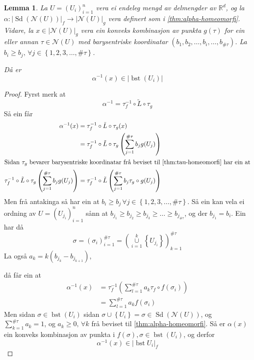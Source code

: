 \documentclass[a4paper, 12pt, norsk]{article}
\theoremstyle{plain}
\newtheorem{lemma}[theorem]{Lemma}
\theoremstyle{definition}
\newcommand{\Rb}{\mathbb{R}}
\newcommand{\Nc}{\mathcal{N}}
\newcommand{\union}{ \mathop{\cup}\limits }
\newcommand{\gr}[1]{ \lvert #1 \rvert } %
\newcommand{\set}[1]{ \left\{ #1 \right\} } %
\newcommand{\tuple}[1]{ \left( #1 \right) } %
\DeclareMathOperator{\Sd}{Sd} %
\DeclareMathOperator{\bst}{bst} %
\begin{document}
\begin{lemma} \label{thm:bst-betingingar}
	La \( U = \tuple{U_i}_{i=1}^n \) vera ei endeleg mengd av delmengder av \( \Rb^d \), og la \( \alpha: \gr{\Sd(\Nc(U))}_f \to \gr{\Nc(U)}_g \) vera definert som i \autoref{thm:alpha-homeomorfi}. Vidare, la \( x \in \gr{\Nc(U)}_g \) vera ein konveks kombinasjon av punkta \( g(\tau) \) for ein eller annan \( \tau \in \Nc(U) \) med barysentriske koordinatar \( \tuple{b_1, b_2,\dots, b_i, \dots, b_{\#\tau}} \). La \( b_i \geq b_j, \, \forall j \in \set{1, 2, 3, \dots, \#\tau} \). 
	
	Då er
	\[ 
		\alpha^{-1}(x) \in \gr{\bst(U_i)}
	\]
\end{lemma}

\begin{proof}
	Fyrst merk at
	\[
		\alpha^{-1} = \tau_f^{-1} \circ \tilde{L} \circ \tau_g
	\]
	Så ein får
	\begin{align*}
		\alpha^{-1}(x) &= \tau_f^{-1} \circ \tilde{L} \circ \tau_g (x) \\
		&= \tau_f^{-1} \circ \tilde{L} \circ \tau_g \tuple{\sum_{j=1}^{\#\tau} b_j g(U_j)} \\
		\intertext{Sidan \( \tau_g \) bevarer barysentriske koordinatar frå beviset til \autoref{thm:tau-homeomorfi} har ein at}
		\tau_f^{-1} \circ \tilde{L} \circ \tau_g \tuple{\sum_{j=1}^{\#\tau} b_j g(U_j)} &= \tau_f^{-1} \circ \tilde{L} \tuple{\sum_{j=1}^{\#\tau} b_j \tau_g \circ g(U_j)}
	\end{align*}
	Men frå antakinga så har ein at \( b_i \geq b_j \, \forall j \in \set{1, 2, 3, \dots, \#\tau} \). Så ein kan vela ei ordning av \( U = \tuple{U_{j_i}}_{i=1}^n \) sånn at \( b_{j_1} \geq b_{j_2} \geq b_{j_3} \geq \dots \geq b_{j_{\#\tau}} \), og der \( b_{j_1}=b_i \). Ein har då 
	\[
		\sigma = \tuple{\sigma_i}_{i=1}^{\#\tau} = \tuple{\union_{i=1}^k \set{U_{j_i}}}_{k=1}^{\#\tau} 
	\]
	La også \( a_k = k\tuple{b_{j_k}-b_{j_{k+1}}} \),

	då får ein at
	\begin{align*}
		\alpha^{-1}(x) &= \tau_f^{-1} \tuple{\sum_{l=1}^{\#\tau}a_k \tau_f \circ f(\sigma_i)} \\
		&= \sum_{l=1}^{\#\tau} a_k f(\sigma_i)
	\end{align*}
	Men sidan \( \sigma \in \bst(U_i) \) sidan \( \sigma \union \set{U_i} = \sigma \in \Sd(\Nc(U)) \), og \( \sum_{k=1}^{\#\tau} a_k = 1 \), og \( a_k \geq 0, \, \forall k \) frå beviset til \autoref{thm:alpha-homeomorfi}. Så er \( \alpha(x) \) ein konveks kombinasjon av punkta i \( f(\sigma), \sigma \in \bst(U_i) \), og derfor
	\[
		\alpha^{-1}(x) \in \gr{\bst{U_i}}_f
	\]
\end{proof}
\end{document}
